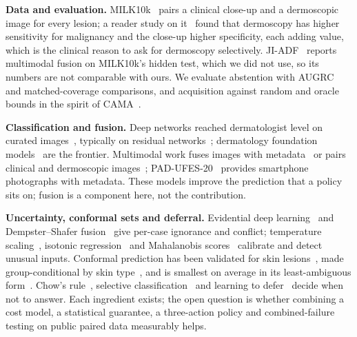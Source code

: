 \documentclass[conference]{IEEEtran}
\begin{document}
\textbf{Data and evaluation.} MILK10k~\cite{r4} pairs a clinical close-up and a dermoscopic image for every lesion; a reader study on it~\cite{r5} found that dermoscopy has higher sensitivity for malignancy and the close-up higher specificity, each adding value, which is the clinical reason to ask for dermoscopy selectively. JI-ADF~\cite{r6} reports multimodal fusion on MILK10k's hidden test, which we did not use, so its numbers are not comparable with ours. We evaluate abstention with AUGRC~\cite{r7} and matched-coverage comparisons, and acquisition against random and oracle bounds in the spirit of CAMA~\cite{r8}.

\textbf{Classification and fusion.} Deep networks reached dermatologist level on curated images~\cite{r1}, typically on residual networks~\cite{r9}; dermatology foundation models~\cite{r10} are the frontier. Multimodal work fuses images with metadata~\cite{r11} or pairs clinical and dermoscopic images~\cite{r12}; PAD-UFES-20~\cite{r13} provides smartphone photographs with metadata. These models improve the prediction that a policy sits on; fusion is a component here, not the contribution.

\textbf{Uncertainty, conformal sets and deferral.} Evidential deep learning~\cite{r14} and Dempster--Shafer fusion~\cite{r15,r16} give per-case ignorance and conflict; temperature scaling~\cite{r17}, isotonic regression~\cite{r18} and Mahalanobis scores~\cite{r19} calibrate and detect unusual inputs. Conformal prediction has been validated for skin lesions~\cite{r20}, made group-conditional by skin type~\cite{r21}, and is smallest on average in its least-ambiguous form~\cite{r22}. Chow's rule~\cite{r23}, selective classification~\cite{r24} and learning to defer~\cite{r25} decide when not to answer. Each ingredient exists; the open question is whether combining a cost model, a statistical guarantee, a three-action policy and combined-failure testing on public paired data measurably helps.
\end{document}
